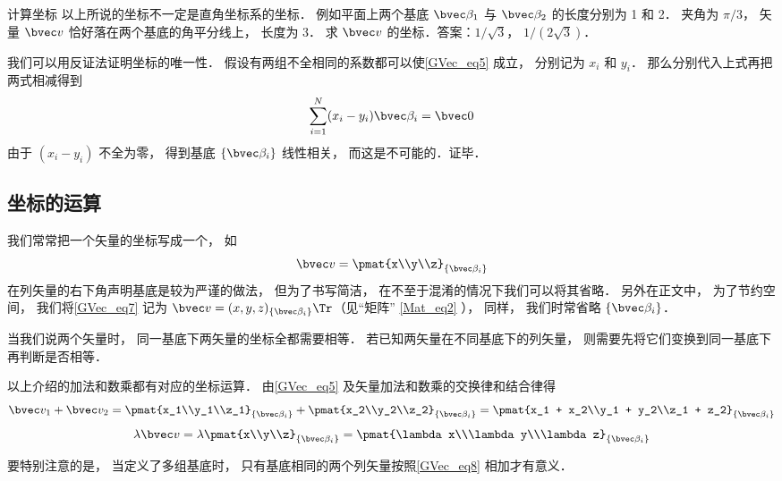 \begin{exercise}{计算坐标}
以上所说的坐标不一定是直角坐标系的坐标． 例如平面上两个基底 $\bvec \beta_1$ 与 $\bvec \beta_2$ 的长度分别为 1 和 2． 夹角为 $\pi/3$， 矢量 $\bvec v$ 恰好落在两个基底的角平分线上， 长度为 3． 求 $\bvec v$ 的坐标．答案：$1/\sqrt 3$， $1/(2\sqrt 3)$．
\end{exercise}

我们可以用反证法证明坐标的唯一性． 假设有两组不全相同的系数都可以使\autoref{GVec_eq5} 成立， 分别记为 $x_i$ 和 $y_i$． 那么分别代入上式再把两式相减得到
\begin{equation}
\sum_{i=1}^N (x_i-y_i) \bvec \beta_i = \bvec 0
\end{equation}
由于 $(x_i-y_i)$ 不全为零， 得到基底 $\{\bvec \beta_i\}$ 线性相关， 而这是不可能的．证毕．

\subsection{坐标的运算}
我们常常把一个矢量的坐标写成一个， 如
\begin{equation}\label{GVec_eq7}
\bvec v = \pmat{x\\y\\z}_{\{\bvec\beta_i\}}
\end{equation}
在列矢量的右下角声明基底是较为严谨的做法， 但为了书写简洁， 在不至于混淆的情况下我们可以将其省略． 另外在正文中， 为了节约空间， 我们将\autoref{GVec_eq7} 记为 $\bvec v = (x, y, z)_{\{\bvec\beta_i\}}\Tr$（见“矩阵” \autoref{Mat_eq2} ）， 同样， 我们时常省略 $\{\bvec\beta_i\}$．

当我们说两个矢量时， 同一基底下两矢量的坐标全都需要相等． 若已知两矢量在不同基底下的列矢量， 则需要先将它们变换到同一基底下再判断是否相等．

以上介绍的加法和数乘都有对应的坐标运算． 由\autoref{GVec_eq5} 及矢量加法和数乘的交换律和结合律得
\begin{equation}\label{GVec_eq8}
\bvec v_1 + \bvec v_2 = \pmat{x_1\\y_1\\z_1}_{\{\bvec\beta_i\}} + \pmat{x_2\\y_2\\z_2}_{\{\bvec\beta_i\}} = \pmat{x_1 + x_2\\y_1 + y_2\\z_1 + z_2}_{\{\bvec\beta_i\}}
\end{equation}
\begin{equation}\label{GVec_eq9}
\lambda \bvec v = \lambda\pmat{x\\y\\z}_{\{\bvec\beta_i\}} = \pmat{\lambda x\\\lambda y\\\lambda z}_{\{\bvec\beta_i\}}
\end{equation}

要特别注意的是， 当定义了多组基底时， 只有基底相同的两个列矢量按照\autoref{GVec_eq8} 相加才有意义．
